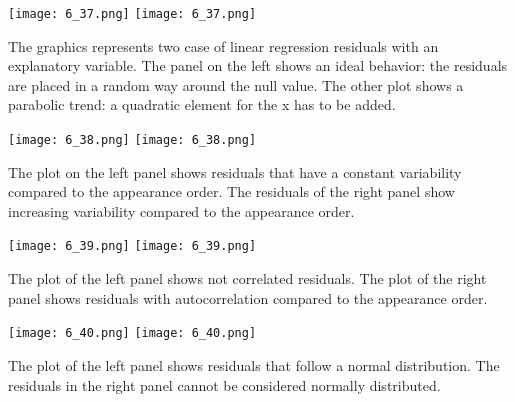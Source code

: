 \begin{frame}
  \vspace*{-.5cm}
  \begin{center}
      {\texttt{[image: 6\_37.png]}}
      {\texttt{[image: 6\_37.png]}}
  \end{center}
  \vspace*{-.3cm}
  The graphics represents two case of linear regression residuals with an explanatory variable. The panel on the left shows an ideal behavior: the residuals are placed in a random way around the null value. The other plot shows a parabolic trend: a quadratic element for the x has to be added.
\end{frame}

\begin{frame}
  \begin{center}
      {\texttt{[image: 6\_38.png]}}
      {\texttt{[image: 6\_38.png]}}
  \end{center}
  The plot on the left panel shows residuals that have a constant variability compared to the appearance order. The residuals of the right panel show increasing variability compared to the appearance order.
\end{frame}

\begin{frame}
  \begin{center}
      {\texttt{[image: 6\_39.png]}}
      {\texttt{[image: 6\_39.png]}}
  \end{center}
  The plot of the left panel shows not correlated residuals. The plot of the right panel shows residuals with autocorrelation compared to the appearance order.
\end{frame}

\begin{frame}
  \begin{center}
      {\texttt{[image: 6\_40.png]}}
      {\texttt{[image: 6\_40.png]}}
  \end{center}
  The plot of the left panel shows residuals that follow a normal distribution. The residuals in the right panel cannot be considered normally distributed.
\end{frame}


